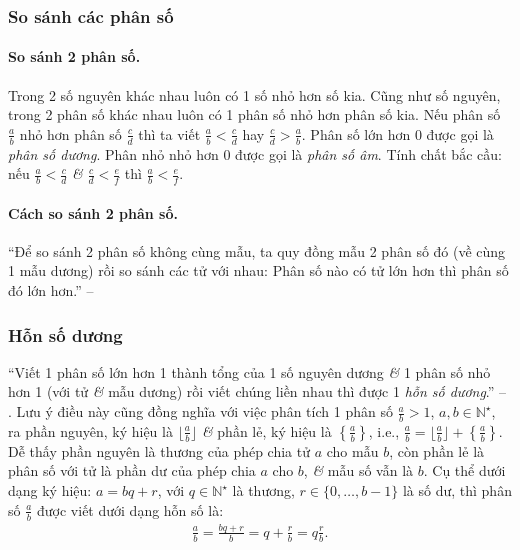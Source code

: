 \documentclass{article}
\numberwithin{equation}{section}
\begin{document}
\subsubsection{So sánh các phân số}

\paragraph{So sánh 2 phân số.} Trong 2 số nguyên khác nhau luôn có 1 số nhỏ hơn số kia. Cũng như số nguyên, trong 2 phân số khác nhau luôn có 1 phân số nhỏ hơn phân số kia. Nếu phân số $\frac{a}{b}$ nhỏ hơn phân số $\frac{c}{d}$ thì ta viết $\frac{a}{b} < \frac{c}{d}$ hay $\frac{c}{d} > \frac{a}{b}$. Phân số lớn hơn 0 được gọi là \emph{phân số dương}. Phân nhỏ nhỏ hơn 0 được gọi là \emph{phân số âm}. Tính chất bắc cầu: nếu $\frac{a}{b} < \frac{c}{d}$ \textit{\&} $\frac{c}{d} < \frac{e}{f}$ thì $\frac{a}{b} < \frac{e}{f}$.

\paragraph{Cách so sánh 2 phân số.} ``Để so sánh 2 phân số không cùng mẫu, ta quy đồng mẫu 2 phân số đó (về cùng 1 mẫu dương) rồi so sánh các tử với nhau: Phân số nào có tử lớn hơn thì phân số đó lớn hơn.'' -- \cite[p. 31]{SGK_Toan_6_Canh_Dieu_tap_1}

\subsubsection{Hỗn số dương}
``Viết 1 phân số lớn hơn 1 thành tổng của 1 số nguyên dương \textit{\&} 1 phân số nhỏ hơn 1 (với tử \textit{\&} mẫu dương) rồi viết chúng liền nhau thì được 1 \emph{hỗn số dương}.'' -- \cite[p. 32]{SGK_Toan_6_Canh_Dieu_tap_2}. Lưu ý điều này cũng đồng nghĩa với việc phân tích 1 phân số $\frac{a}{b} > 1$, $a,b\in\mathbb{N}^\star$, ra phần nguyên, ký hiệu là $\lfloor\frac{a}{b}\rfloor$ \textit{\&} phần lẻ, ký hiệu là $\left\{\frac{a}{b}\right\}$, i.e., $\frac{a}{b} = \lfloor\frac{a}{b}\rfloor + \left\{\frac{a}{b}\right\}$. Dễ thấy phần nguyên là thương của phép chia tử $a$ cho mẫu $b$, còn phần lẻ là phân số với tử là phần dư của phép chia $a$ cho $b$, \textit{\&} mẫu số vẫn là $b$. Cụ thể dưới dạng ký hiệu: $a = bq + r$, với $q\in\mathbb{N}^\star$ là thương, $r\in\{0,\ldots,b - 1\}$ là số dư, thì phân số $\frac{a}{b}$ được viết dưới dạng hỗn số là:
\begin{align*}
	\frac{a}{b} = \frac{bq + r}{b} = q + \frac{r}{b} = q\frac{r}{b}.
\end{align*}
\end{document}
